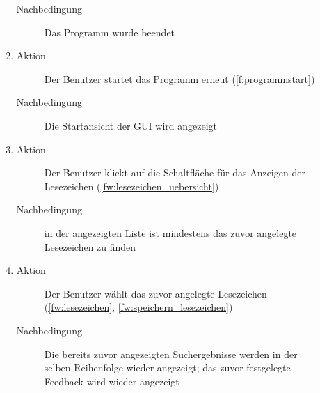 \begin{description}
\begin{enumerate}
\begin{description}
			\item[Nachbedingung] Das Programm wurde beendet
		\end{description}
		\item
		\begin{description}
			\item[Aktion] Der Benutzer startet das Programm erneut (\ref{f:programmstart})
			\item[Nachbedingung] Die Startansicht der GUI wird angezeigt
		\end{description}
		\item
		\begin{description}
			\item[Aktion] Der Benutzer klickt auf die Schaltfläche für das Anzeigen der Lesezeichen (\ref{fw:lesezeichen_uebersicht})
			\item[Nachbedingung] in der angezeigten Liste ist mindestens das zuvor angelegte Lesezeichen zu finden
		\end{description}
		\item
		\begin{description}
			\item[Aktion] Der Benutzer wählt das zuvor angelegte Lesezeichen (\ref{fw:lesezeichen}, \ref{fw:speichern_lesezeichen})
			\item[Nachbedingung] Die bereits zuvor angezeigten Suchergebnisse werden in der selben Reihenfolge wieder angezeigt; das zuvor festgelegte Feedback wird wieder angezeigt
		\end{description}
	\end{enumerate}


\end{description}
